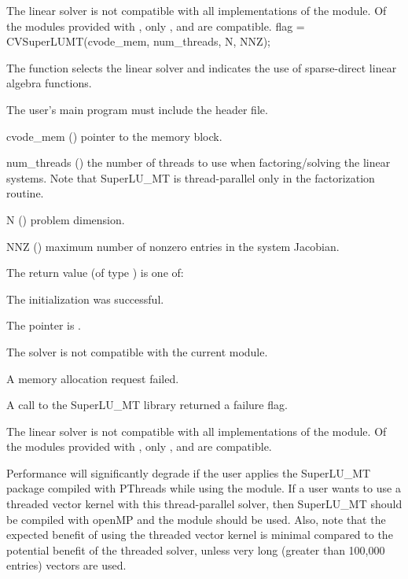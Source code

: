 {
  The {\cvklu} linear solver is not compatible with all
  implementations of the {\nvector} module. 
  Of the {\nvector} modules provided with {\sundials}, only {\nvecs},
  {\nvecopenmp} and {\nvecpthreads} are compatible.
}
{
  flag = CVSuperLUMT(cvode\_mem, num\_threads, N, NNZ);
}
{
  The function  selects the {\cvsuperlumt} linear
  solver and indicates the use of sparse-direct linear
  algebra functions.

  The user's main program must include the  header file.
}
{
  \begin{args}
  \item[cvode\_mem] ()
    pointer to the {\cvode} memory block.
  \item[num\_threads] ()
    the number of threads to use when factoring/solving the linear systems.
    Note that SuperLU\_MT is thread-parallel only in the factorization routine.
  \item[N] ()
    problem dimension.
  \item[NNZ] ()
    maximum number of nonzero entries in the system Jacobian.
  \end{args}
}
{
  The return value  (of type ) is one of:
  \begin{args}
  \item[\Id{CVSLS\_SUCCESS}] 
    The {\cvsuperlumt} initialization was successful.
  \item[\Id{CVSLS\_MEM\_NULL}]
    The  pointer is .
  \item[\Id{CVSLS\_ILL\_INPUT}]
    The {\cvsuperlumt} solver is not compatible with the current {\nvector} module.
  \item[\Id{CVSLS\_MEM\_FAIL}]
    A memory allocation request failed.
  \item[\Id{CVSLS\_PACKAGE\_FAIL}]
    A call to the SuperLU\_MT library returned a failure flag.
  \end{args}
}
{
  The {\cvsuperlumt} linear solver is not compatible with all
  implementations of the {\nvector} module. 
  Of the {\nvector} modules provided with {\sundials}, only {\nvecs},
  {\nvecopenmp} and {\nvecpthreads} are compatible.

  {\warn}Performance will significantly degrade if the user applies the SuperLU\_MT
  package compiled with PThreads while using the {\nvecopenmp} module.
  If a user wants to use a threaded vector kernel with this thread-parallel
  solver, then SuperLU\_MT should be compiled with openMP and the {\nvecopenmp}
  module should be used.  Also, note that the expected benefit of using the threaded
  vector kernel is minimal compared to the potential benefit of the threaded solver,
  unless very long (greater than 100,000 entries) vectors are used.
}
